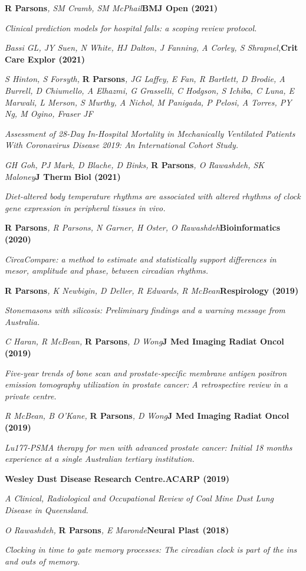 \item
    \textbf{R Parsons}\textit{, SM Cramb, SM McPhail}\textbf{\hfill BMJ Open (2021)}\par 
    \textit{Clinical prediction models for hospital falls: a scoping review protocol.}
\item
    \textit{Bassi GL, JY Suen, N White, HJ Dalton, J Fanning, A Corley, S Shrapnel,}\textbf{\hfill Crit Care Explor (2021)}\par
	\textit{S Hinton, S Forsyth, }\textbf{R Parsons}\textit{, JG Laffey, E Fan, R Bartlett, D Brodie, A Burrell, D Chiumello, A Elhazmi, G Grasselli, C Hodgson, S Ichiba, C Luna, E Marwali, L Merson, S Murthy, A Nichol, M Panigada, P Pelosi, A Torres, PY Ng, M Ogino, Fraser JF}\par
    \textit{Assessment of 28-Day In-Hospital Mortality in Mechanically Ventilated Patients With Coronavirus Disease 2019: An International Cohort Study.}
\item
    \textit{GH Goh, PJ Mark, D Blache, D Binks, }\textbf{R Parsons}\textit{, O Rawashdeh, SK Maloney}\textbf{\hfill J Therm Biol (2021)}\par 
    \textit{Diet-altered body temperature rhythms are associated with altered rhythms of clock gene expression in peripheral tissues in vivo.}
\item
    \textbf{R Parsons}\textit{, R Parsons, N Garner, H Oster, O Rawashdeh}\textbf{\hfill Bioinformatics (2020)}\par 
    \textit{CircaCompare: a method to estimate and statistically support differences in mesor, amplitude and phase, between circadian rhythms.}
\item
    \textbf{R Parsons}\textit{, K Newbigin, D Deller, R Edwards, R McBean}\textbf{\hfill Respirology (2019)}\par 
    \textit{Stonemasons with silicosis: Preliminary findings and a warning message from Australia.}
\item
    \textit{C Haran, R McBean, }\textbf{R Parsons}\textit{, D Wong}\textbf{\hfill J Med Imaging Radiat Oncol (2019)}\par 
    \textit{Five-year trends of bone scan and prostate-specific membrane antigen positron emission tomography utilization in prostate cancer: A retrospective review in a private centre.}
\item
    \textit{R McBean, B O'Kane, }\textbf{R Parsons}\textit{, D Wong}\textbf{\hfill J Med Imaging Radiat Oncol (2019)}\par 
    \textit{Lu177‐PSMA therapy for men with advanced prostate cancer: Initial 18 months experience at a single Australian tertiary institution.}
\item
    \textbf{Wesley Dust Disease Research Centre.}\textbf{\hfill ACARP (2019)}\par 
    \textit{A Clinical, Radiological and Occupational Review of Coal Mine Dust Lung Disease in Queensland.}
\item
    \textit{O Rawashdeh, }\textbf{R Parsons}\textit{, E Maronde}\textbf{\hfill Neural Plast (2018)}\par 
    \textit{Clocking in time to gate memory processes: The circadian clock is part of the ins and outs of memory.}
